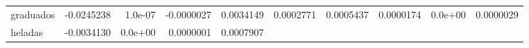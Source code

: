\documentclass[]{article}
\begin{document}
\begin{longtable}[]{@{}lrrrrrrrrr@{}}
\begin{minipage}[t]{0.09\columnwidth}\raggedright\strut
graduados\strut
\end{minipage} & \begin{minipage}[t]{0.07\columnwidth}\raggedleft\strut
-0.0245238\strut
\end{minipage} & \begin{minipage}[t]{0.07\columnwidth}\raggedleft\strut
1.0e-07\strut
\end{minipage} & \begin{minipage}[t]{0.07\columnwidth}\raggedleft\strut
-0.0000027\strut
\end{minipage} & \begin{minipage}[t]{0.09\columnwidth}\raggedleft\strut
0.0034149\strut
\end{minipage} & \begin{minipage}[t]{0.07\columnwidth}\raggedleft\strut
0.0002771\strut
\end{minipage} & \begin{minipage}[t]{0.07\columnwidth}\raggedleft\strut
0.0005437\strut
\end{minipage} & \begin{minipage}[t]{0.07\columnwidth}\raggedleft\strut
0.0000174\strut
\end{minipage} & \begin{minipage}[t]{0.06\columnwidth}\raggedleft\strut
0.0e+00\strut
\end{minipage} & \begin{minipage}[t]{0.09\columnwidth}\raggedleft\strut
0.0000029\strut
\end{minipage}\tabularnewline
\begin{minipage}[t]{0.09\columnwidth}\raggedright\strut
heladas\strut
\end{minipage} & \begin{minipage}[t]{0.07\columnwidth}\raggedleft\strut
-0.0034130\strut
\end{minipage} & \begin{minipage}[t]{0.07\columnwidth}\raggedleft\strut
0.0e+00\strut
\end{minipage} & \begin{minipage}[t]{0.07\columnwidth}\raggedleft\strut
0.0000001\strut
\end{minipage} & \begin{minipage}[t]{0.09\columnwidth}\raggedleft\strut
0.0007907\strut
\end{minipage} & \begin{minipage}[t]{0.07\columnwidth}\raggedleft\strut

\end{minipage}
\end{longtable}
\end{document}
